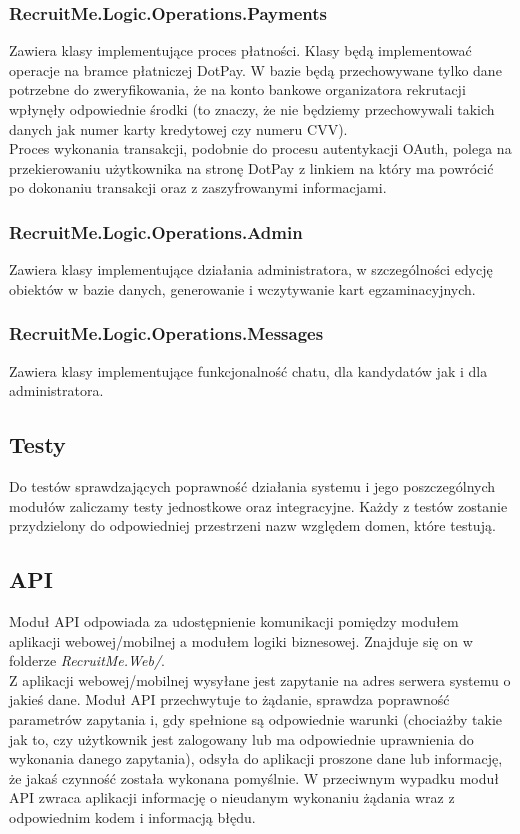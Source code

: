 \documentclass{article}
\begin{document}
\subsubsection{RecruitMe.Logic.Operations.Payments}
Zawiera klasy implementujące proces płatności. Klasy będą implementować operacje na bramce płatniczej DotPay. W bazie będą przechowywane tylko dane potrzebne do zweryfikowania, że na konto bankowe organizatora rekrutacji wpłynęły odpowiednie środki (to znaczy, że nie będziemy przechowywali takich danych jak numer karty kredytowej czy numeru CVV). \\
Proces wykonania transakcji, podobnie do procesu autentykacji OAuth, polega na przekierowaniu użytkownika na stronę DotPay z linkiem na który ma powrócić po dokonaniu transakcji oraz z zaszyfrowanymi informacjami.

\subsubsection{RecruitMe.Logic.Operations.Admin}
Zawiera klasy implementujące działania administratora, w szczególności edycję obiektów w bazie danych, generowanie i wczytywanie kart egzaminacyjnych.

\subsubsection{RecruitMe.Logic.Operations.Messages}
Zawiera klasy implementujące funkcjonalność chatu, dla kandydatów jak i dla administratora.

\subsection{Testy}
Do testów sprawdzających poprawność działania systemu i jego poszczególnych modułów zaliczamy testy jednostkowe oraz integracyjne. Każdy z testów zostanie przydzielony do odpowiedniej przestrzeni nazw względem domen, które testują.

\subsection{API}
Moduł API odpowiada za udostępnienie komunikacji pomiędzy modułem aplikacji webowej/mobilnej a modułem logiki biznesowej. Znajduje się on w folderze \emph{RecruitMe.Web/}. \\
Z aplikacji webowej/mobilnej wysyłane jest zapytanie na adres serwera systemu o jakieś dane. Moduł API przechwytuje to żądanie, sprawdza poprawność parametrów zapytania i, gdy spełnione są odpowiednie warunki (chociażby takie jak to, czy użytkownik jest zalogowany lub ma odpowiednie uprawnienia do wykonania danego zapytania), odsyła do aplikacji proszone dane lub informację, że jakaś czynność została wykonana pomyślnie. W przeciwnym wypadku moduł API zwraca aplikacji informację o nieudanym wykonaniu żądania wraz z odpowiednim kodem i informacją błędu.
\end{document}
